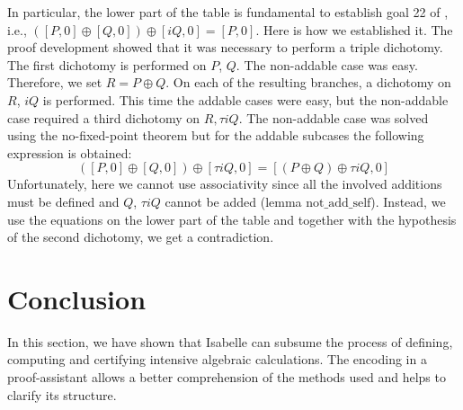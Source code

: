 \documentclass{llncs}
\begin{document}
In particular, the lower part of the table is fundamental to establish
goal 22 of \cite{hales2016group}, i.e., $([P,0] \oplus [Q,0]) \oplus
[iQ,0] = [P,0]$. Here is how we established it. The proof development
showed that it was necessary to perform a triple dichotomy. The first
dichotomy is performed on $P$, $Q$. The non-addable case was
easy. Therefore, we set $R = P \oplus Q$. On each of the resulting
branches, a dichotomy on $R$, $iQ$ is performed. This time the addable
cases were easy, but the non-addable case required a third dichotomy
on $R,\tau i Q$. The non-addable case was solved using the
no-fixed-point theorem but for the addable subcases the following
expression is obtained: $$([P,0] \oplus [Q,0]) \oplus [\tau i Q,0] =
[(P \oplus Q) \oplus \tau i Q,0]$$ Unfortunately, here we cannot use
associativity since all the involved additions must be defined and
$Q$, $\tau i Q$ cannot be added (lemma
$\text{not\_add\_self}$). Instead, we use the equations on the lower
part of the table and together with the hypothesis of the second
dichotomy, we get a contradiction.

\section{Conclusion}


In this section, we have shown that Isabelle can subsume the process
of defining, computing and certifying intensive algebraic
calculations. The encoding in a proof-assistant allows a better
comprehension of the methods used and helps to clarify its structure.


\newpage


 

\end{document}
